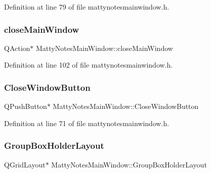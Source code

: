 Definition at line 79 of file mattynotesmainwindow.\+h.

\hypertarget{classMattyNotesMainWindow_a32fe79cffd4624ce7579cabc6f433932}{}\label{classMattyNotesMainWindow_a32fe79cffd4624ce7579cabc6f433932} 
\subsubsection{\texorpdfstring{close\+Main\+Window}{closeMainWindow}}
{\footnotesize\ttfamily Q\+Action$\ast$ Matty\+Notes\+Main\+Window\+::close\+Main\+Window\hspace{0.3cm}{\ttfamily [private]}}



Definition at line 102 of file mattynotesmainwindow.\+h.

\hypertarget{classMattyNotesMainWindow_ac2eeae021e41b4529f0a0f370c6ea9ac}{}\label{classMattyNotesMainWindow_ac2eeae021e41b4529f0a0f370c6ea9ac} 
\subsubsection{\texorpdfstring{Close\+Window\+Button}{CloseWindowButton}}
{\footnotesize\ttfamily Q\+Push\+Button$\ast$ Matty\+Notes\+Main\+Window\+::\+Close\+Window\+Button\hspace{0.3cm}{\ttfamily [private]}}



Definition at line 71 of file mattynotesmainwindow.\+h.

\hypertarget{classMattyNotesMainWindow_ad0fc70c3a6eb0d3ac31518dd7350d21c}{}\label{classMattyNotesMainWindow_ad0fc70c3a6eb0d3ac31518dd7350d21c} 
\subsubsection{\texorpdfstring{Group\+Box\+Holder\+Layout}{GroupBoxHolderLayout}}
{\footnotesize\ttfamily Q\+Grid\+Layout$\ast$ Matty\+Notes\+Main\+Window\+::\+Group\+Box\+Holder\+Layout\hspace{0.3cm}{\ttfamily [private]}}



